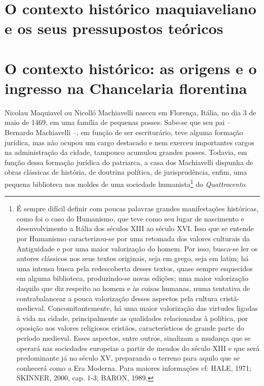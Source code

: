\section{O contexto histórico maquiaveliano e os seus pressupostos teóricos}

\section{O contexto histórico: as origens e o ingresso na Chancelaria florentina}

Nicolau Maquiavel ou Nicolló Machiavelli nasceu em Florença, Itália, no
dia 3 de maio de 1469, em uma família de pequenas posses. Sabe-se que
seu pai -- Bernardo Machiavelli --, em função de ser escriturário, teve
alguma formação jurídica, mas não ocupou um cargo destacado e nem
exerceu importantes cargos na administração da cidade, tampouco acumulou
grandes posses. Todavia, em função dessa formação jurídica do patriarca,
a casa dos Machiavelli dispunha de obras clássicas de história, de
doutrina política, de jurisprudência, enfim, uma pequena biblioteca nos
moldes de uma sociedade humanista\footnote{É sempre difícil definir com
  poucas palavras grandes manifestações históricas, como foi o caso do
  Humanismo, que teve como seu lugar de nascimento e desenvolvimento a
  Itália dos séculos XIII ao século XVI. Isso que se entende por
  Humanismo caracterizou-se por uma retomada dos valores culturais da
  Antiguidade e por uma maior valorização do homem. Por isso, busca-se
  ler os autores clássicos nos seus textos originais, seja em grego,
  seja em latim; há uma intensa busca pela redescoberta desses textos,
  quase sempre esquecidos em alguma biblioteca, produzindo-se novas
  edições; uma maior valorização daquilo que diz respeito ao homem e às
  coisas humanas, numa tentativa de contrabalancear a pouca valorização
  desses aspectos pela cultura cristã-medieval. Concomitantemente, há
  uma maior valorização das virtudes ligadas à vida na cidade,
  principalmente as qualidades relacionadas à política, por oposição aos
  valores religiosos cristãos, característicos de grande parte do
  período medieval. Esses aspectos, entre outros, sinalizam a mudança
  que se operará nas sociedades europeias a partir de meados do século
  XIII e que será predominante já no século XV, preparando o terreno
  para aquilo que se conhecerá como a Era Moderna. Para maiores
  informações cf: HALE, 1971; SKINNER, 2000, cap. 1-3; BARON, 1989.} do
\emph{Quattrocento}.

